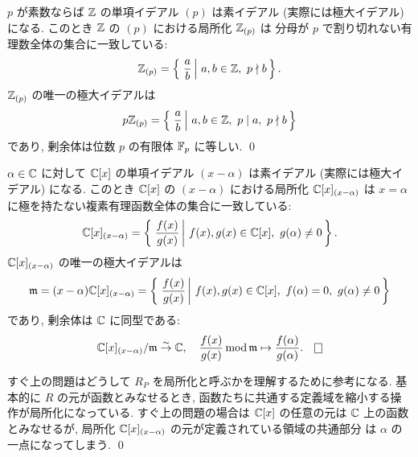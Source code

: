 \documentclass[12pt,twoside]{jarticle}
\begin{document}
\begin{question}
 $p$ が素数ならば ${\mathbb Z}$ の単項イデアル $(p)$ は素イデアル
 (実際には極大イデアル) になる.
 このとき ${\mathbb Z}$ の $(p)$ における局所化 ${\mathbb Z}_{(p)}$ は %
 分母が $p$ で割り切れない有理数全体の集合に一致している:
 \begin{equation*}
  {\mathbb Z}_{(p)} = 
  \left\{\,\left. \frac{a}{b} \,\right|\, a,b\in{\mathbb Z},\ p\nmid b \,\right\}.
 \end{equation*}
 ${\mathbb Z}_{(p)}$ の唯一の極大イデアルは
 \begin{equation*}
  p{\mathbb Z}_{(p)} =
  \left\{\,\left. \frac{a}{b} 
  \,\right|\, a,b\in{\mathbb Z},\ p\mid a,\ p\nmid b \,\right\}
 \end{equation*}
 であり, 剰余体は位数 $p$ の有限体 ${\mathbb F}_p$ に等しい.
 \qed
\end{question}

\begin{question}
 $\alpha\in{\mathbb C}$ に対して ${\mathbb C}[x]$ の単項イデアル $(x-\alpha)$ は素イデアル
 (実際には極大イデアル) になる. 
 このとき ${\mathbb C}[x]$ の $(x-\alpha)$ における局所化 ${\mathbb C}[x]_{(x-\alpha)}$ は %
 $x=\alpha$ に極を持たない複素有理函数全体の集合に一致している:
 \begin{equation*}
  {\mathbb C}[x]_{(x-\alpha)} =
   \left\{\,\left. \frac{f(x)}{g(x)} 
   \,\right|\, f(x),g(x)\in{\mathbb C}[x],\ g(\alpha)\ne 0 \,\right\}.
 \end{equation*}
 ${\mathbb C}[x]_{(x-\alpha)}$ の唯一の極大イデアルは
 \begin{equation*}
  {\mathfrak m} = (x-\alpha){\mathbb C}[x]_{(x-\alpha)} =
   \left\{\,\left. \frac{f(x)}{g(x)} 
   \,\right|\, f(x),g(x)\in{\mathbb C}[x],\ f(\alpha)=0,\ g(\alpha)\ne 0 \,\right\}
 \end{equation*}
 であり, 剰余体は ${\mathbb C}$ に同型である:
 \begin{equation*}
  \C[x]_{(x-\alpha)}/\frakm \isomto \C, \quad
  \frac{f(x)}{g(x)}\MOD\frakm \mapsto \frac{f(\alpha)}{g(\alpha)}.
  \qed
 \end{equation*}
\end{question}

\begin{guide}
 すぐ上の問題はどうして $R_P$ を局所化と呼ぶかを理解するために参考になる.
 基本的に $R$ の元が函数とみなせるとき, 
 函数たちに共通する定義域を縮小する操作が局所化になっている.
 すぐ上の問題の場合は ${\mathbb C}[x]$ の任意の元は ${\mathbb C}$ 上の函数とみなせるが, 
 局所化 ${\mathbb C}[x]_{(x-\alpha)}$ の元が定義されている領域の共通部分
 は $\alpha$ の一点になってしまう.
 \qed
\end{guide}
\end{document}
